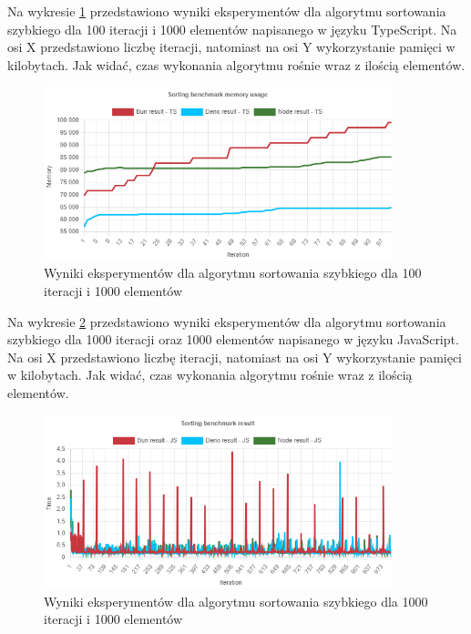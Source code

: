 Na wykresie \ref{fig:radix_sorting_e2_memory_ts} przedstawiono wyniki eksperymentów dla algorytmu sortowania szybkiego dla 100 iteracji i 1000 elementów napisanego w języku TypeScript. Na osi X przedstawiono liczbę iteracji, natomiast na osi Y wykorzystanie pamięci w kilobytach. Jak widać, czas wykonania algorytmu rośnie wraz z ilością elementów.
\begin{figure}[H]
  \centering
  \includegraphics[width=0.9\textwidth]{Figures/sorting/radix/e2_memory_ts.png}
  \caption{Wyniki eksperymentów dla algorytmu sortowania szybkiego dla 100 iteracji i 1000 elementów}
  \label{fig:radix_sorting_e2_memory_ts}
\end{figure}

Na wykresie \ref{fig:radix_sorting_e3} przedstawiono wyniki eksperymentów dla algorytmu sortowania szybkiego dla 1000 iteracji oraz 1000 elementów napisanego w języku JavaScript. Na osi X przedstawiono liczbę iteracji, natomiast na osi Y wykorzystanie pamięci w kilobytach. Jak widać, czas wykonania algorytmu rośnie wraz z ilością elementów.
\begin{figure}[H]
  \centering
  \includegraphics[width=0.9\textwidth]{Figures/sorting/radix/e3_js.png}
  \caption{Wyniki eksperymentów dla algorytmu sortowania szybkiego dla 1000 iteracji i 1000 elementów}
  \label{fig:radix_sorting_e3}
\end{figure}

